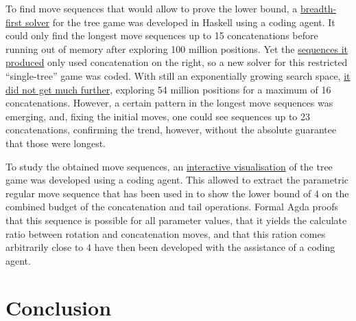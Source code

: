 \documentclass[svgnames,dvipsnames,table,review%
]{jfp-epi}
\newcommand{\SHORTVERSION}[1]{}
\newcommand{\SHORTVERSION}[1]{#1}
\begin{document}
To find move sequences that would allow to prove the lower bound, a \href{https://github.com/andreasabel/tree-rotation/tree/master/app}{breadth-first solver} for the tree game was developed in Haskell using a coding agent.
It could only find the longest move sequences up to 15 concatenations before running out of memory after exploring 100 million positions.
Yet the \href{https://github.com/andreasabel/tree-rotation/blob/df0d1e4ba1696b2746854d7165b58beffba5002f/data/score-full.csv}{sequences it produced} only used concatenation on the right, so a new solver for this restricted ``single-tree'' game was coded.
With still an exponentially growing search space, \href{https://github.com/andreasabel/tree-rotation/blob/df0d1e4ba1696b2746854d7165b58beffba5002f/data/score-crt-exhaustive.csv}{it did not get much further}, exploring 54 million positions for a maximum of 16 concatenations.
However, a certain pattern in the longest move sequences was emerging, and, fixing the initial moves, one could see sequences up to 23 concatenations, confirming the trend, however, without the absolute guarantee that those were longest.

To study the obtained move sequences, an \href{https://andreasabel.github.io/tree-rotation/play/index.html}{interactive visualisation} of the tree game was developed using a coding agent.
This allowed to extract the parametric regular move sequence that has been used in  to show the lower bound of 4 on the combined budget of the concatenation and tail operations.
Formal Agda proofs that this sequence is possible for all parameter values, that it yields the calculate ratio between rotation and concatenation moves, and that this ration comes arbitrarily close to 4 have then been developed with the assistance of a coding agent.



\section{Conclusion}\label{sec:conclusion}










\end{document}
